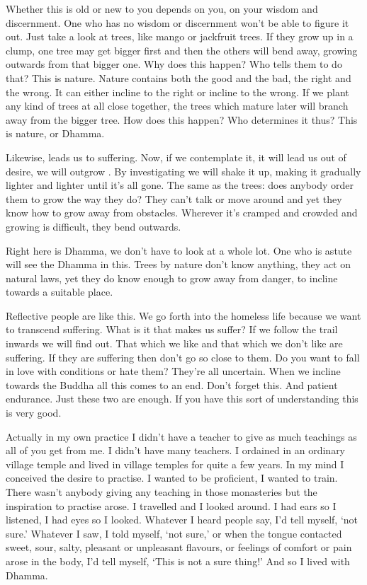 Whether this is old or new to you depends on you, on your wisdom and discernment. One who has no wisdom or discernment won't be able to figure it out. Just take a look at trees, like mango or jackfruit trees. If they grow up in a clump, one tree may get bigger first and then the others will bend away, growing outwards from that bigger one. Why does this happen? Who tells them to do that? This is nature. Nature contains both the good and the bad, the right and the wrong. It can either incline to the right or incline to the wrong. If we plant any kind of trees at all close together, the trees which mature later will branch away from the bigger tree. How does this happen? Who determines it thus? This is nature, or Dhamma.

Likewise,  leads us to suffering. Now, if we contemplate it, it will lead us out of desire, we will outgrow . By investigating  we will shake it up, making it gradually lighter and lighter until it's all gone. The same as the trees: does anybody order them to grow the way they do? They can't talk or move around and yet they know how to grow away from obstacles. Wherever it's cramped and crowded and growing is difficult, they bend outwards.

Right here is Dhamma, we don't have to look at a whole lot. One who is astute will see the Dhamma in this. Trees by nature don't know anything, they act on natural laws, yet they do know enough to grow away from danger, to incline towards a suitable place.

Reflective people are like this. We go forth into the homeless life because we want to transcend suffering. What is it that makes us suffer? If we follow the trail inwards we will find out. That which we like and that which we don't like are suffering. If they are suffering then don't go so close to them. Do you want to fall in love with conditions or hate them? They're all uncertain. When we incline towards the Buddha all this comes to an end. Don't forget this. And patient endurance. Just these two are enough. If you have this sort of understanding this is very good.

Actually in my own practice I didn't have a teacher to give as much teachings as all of you get from me. I didn't have many teachers. I ordained in an ordinary village temple and lived in village temples for quite a few years. In my mind I conceived the desire to practise. I wanted to be proficient, I wanted to train. There wasn't anybody giving any teaching in those monasteries but the inspiration to practise arose. I travelled and I looked around. I had ears so I listened, I had eyes so I looked. Whatever I heard people say, I'd tell myself, `not sure.' Whatever I saw, I told myself, `not sure,' or when the tongue contacted sweet, sour, salty, pleasant or unpleasant flavours, or feelings of comfort or pain arose in the body, I'd tell myself, `This is not a sure thing!' And so I lived with Dhamma.

